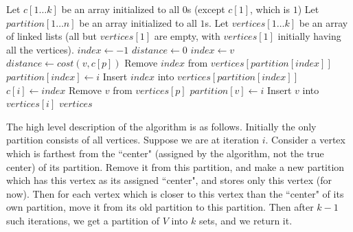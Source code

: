 \documentclass[a4paper]{article}
\newcommand{\nl}{\vspace{0.2cm}\\}
\newcommand{\R}{\mathbb{R}}
\begin{document}
\begin{algorithmic}[1]
    \Function{ApproxPartition}{$G = (V, E)$, $cost : V \times V \to \R$}
    \State Let $c[1 \ldots k]$ be an array initialized to all $0$s (except $c[1]$, which is $1$) 
        \State Let $partition[1 \ldots n]$ be an array initialized to all $1$s. 
        \State Let $vertices[1 \ldots k]$ be an array of linked lists (all but $vertices[1]$ are empty, with $vertices[1]$ initially having all the vertices).
            \State $index \gets -1$
            \State $distance \gets 0$
                        \State $index \gets v$
                        \State $distance \gets cost(v, c[p])$
                    \EndIf
                \EndFor
            \EndFor
            \State Remove $index$ from $vertices[partition[index]]$
            \State $partition[index] \gets i$
            \State Insert $index$ into $vertices[partition[index]]$
            \State $c[i] \gets index$
                        \State Remove $v$ from $vertices[p]$
                        \State $partition[v] \gets i$
                        \State Insert $v$ into $vertices[i]$
                    \EndIf
                \EndFor
            \EndFor
        \EndFor
        \State \Return $vertices$
    \EndFunction
\end{algorithmic}

The high level description of the algorithm is as follows. Initially the only partition consists of all vertices. Suppose we are at iteration $i$. Consider a vertex which is farthest from the ``center" (assigned by the algorithm, not the true center) of its partition. Remove it from this partition, and
make a new partition which has this vertex as its assigned ``center", and stores only this vertex (for now). Then for each vertex which is closer to this vertex than the ``center" of its own
partition, move it from its old partition to this partition. Then after $k - 1$ such iterations, we get a partition of $V$ into $k$ sets, and we return it.\nl
\end{document}
